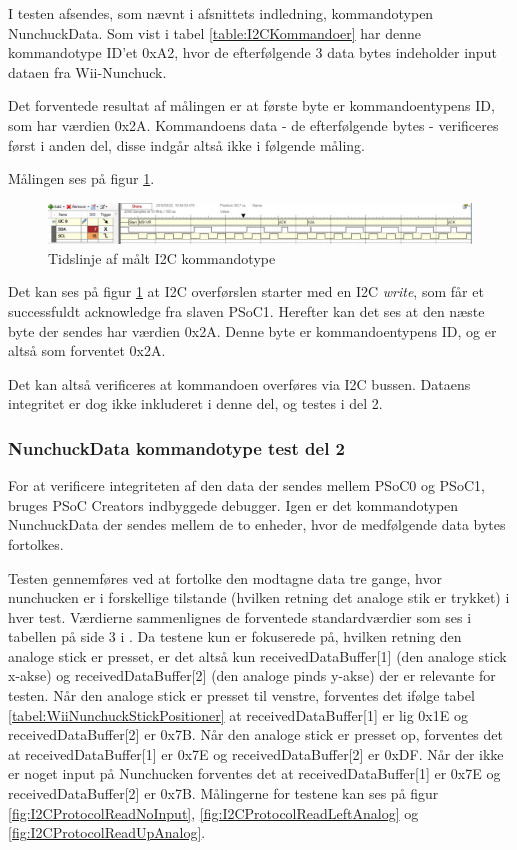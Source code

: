 I testen afsendes, som nævnt i afsnittets indledning, kommandotypen NunchuckData. Som vist i tabel \ref{table:I2CKommandoer} har denne kommandotype ID'et 0xA2, hvor de efterfølgende 3 data bytes indeholder input dataen fra Wii-Nunchuck.

Det forventede resultat af målingen er at første byte er kommandoentypens ID, som har værdien 0x2A. Kommandoens data - de efterfølgende bytes - verificeres først i anden del, disse indgår altså ikke i følgende måling. 

Målingen ses på figur \ref{fig:NunchuckDataCommand}.

\begin{figure}[H]
	\centering
	\includegraphics[width=1.2\textwidth]{Test/images/ShowsNunchuckDataCommand.png}
	\caption{Tidslinje af målt I2C kommandotype}
	\label{fig:NunchuckDataCommand}
\end{figure}

Det kan ses på figur \ref{fig:NunchuckDataCommand} at I2C overførslen starter med en I2C \textit{write}, som får et successfuldt acknowledge fra slaven PSoC1. Herefter kan det ses at den næste byte der sendes har værdien 0x2A. Denne byte er kommandoentypens ID, og er altså som forventet 0x2A.

Det kan altså verificeres at kommandoen overføres via I2C bussen. Dataens integritet er dog ikke inkluderet i denne del, og testes i del 2.

\subsubsection{NunchuckData kommandotype test del 2}
For at verificere integriteten af den data der sendes mellem PSoC0 og PSoC1, bruges PSoC Creators indbyggede debugger. Igen er det kommandotypen NunchuckData der sendes mellem de to enheder, hvor de medfølgende data bytes fortolkes.

Testen gennemføres ved at fortolke den modtagne data tre gange, hvor nunchucken er i forskellige tilstande (hvilken retning det analoge stik er trykket) i hver test. Værdierne sammenlignes de forventede standardværdier som ses i tabellen på side 3 i \cite[I2C Interface with Wii Nunchuck]{nunchuck}. Da testene kun er fokuserede på, hvilken retning den analoge stick er presset, er det altså kun receivedDataBuffer[1] (den analoge stick x-akse) og receivedDataBuffer[2] (den analoge pinds y-akse) der er relevante for testen. Når den analoge stick er presset til venstre, forventes det ifølge tabel \ref{tabel:WiiNunchuckStickPositioner} at receivedDataBuffer[1] er lig 0x1E og receivedDataBuffer[2] er 0x7B. Når den analoge stick er presset op, forventes det at receivedDataBuffer[1] er 0x7E og receivedDataBuffer[2] er 0xDF. Når der ikke er noget input på Nunchucken forventes det at receivedDataBuffer[1] er 0x7E og receivedDataBuffer[2] er 0x7B. Målingerne for testene kan ses på figur \ref{fig:I2CProtocolReadNoInput}, \ref{fig:I2CProtocolReadLeftAnalog} og \ref{fig:I2CProtocolReadUpAnalog}.

